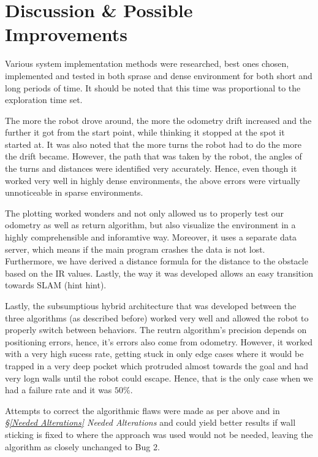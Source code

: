 \documentclass[11pt, a4paper]{article}
\begin{document}

\newpage
\section{Discussion \& Possible Improvements}

\label{Discussion}

Various system implementation methods were researched, best ones chosen, implemented and 
tested in both sprase and dense environment for both short and long periods of time. It
should be noted that this time was proportional to the exploration time set.

The more the robot drove around, the more the odometry drift increased and the further it got from the 
start point, while thinking it stopped at the spot it started at. It was also noted that the more 
turns the robot had to do the more the drift became. However, the path that was taken by the robot,
the angles of the turns and distances were identified very accurately. Hence, even though it worked very 
well in highly dense environments, the above errors were virtually unnoticeable in sparse environments.

The plotting worked wonders and not only allowed us to properly test our odometry as well as return algorithm,
but also visualize the environment in a highly comprehensible and inforamtive way. Moreover, it uses a separate
data server, which means if the main program crashes the data is not lost. Furthermore, we have derived a 
distance formula for the distance to the obstacle based on the IR values. Lastly, the way it was developed 
allows an easy transition towards SLAM (hint hint). %

Lastly, the subsumptious hybrid architecture that was developed between the three algorithms (as described
before) worked very well and allowed the robot to properly switch between behaviors. The reutrn algorithm's precision
depends on positioning errors, hence, it's errors also come from odometry. However, it worked with a
very high sucess rate, getting stuck in only edge cases where it would be trapped in a very deep pocket which
protruded almost towards the goal and had very logn walls until the robot could escape. Hence, that is the only case
when we had a failure rate and it was $50\%$.

Attempts to correct the algorithmic flaws were made as per above and in \textit{\S\ref{Needed Alterations} Needed Alterations}
and could yield better results if wall sticking is fixed to where the approach was used
would not be needed, leaving the algorithm as closely unchanged to Bug 2.
\end{document}

